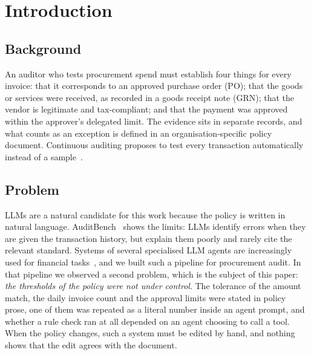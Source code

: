\documentclass[conference]{IEEEtran}
\begin{document}
\section{Introduction}
\subsection{Background}
An auditor who tests procurement spend must establish four things for every invoice: that it corresponds to an approved purchase order (PO); that the goods or services were received, as recorded in a goods receipt note (GRN); that the vendor is legitimate and tax-compliant; and that the payment was approved within the approver's delegated limit. The evidence sits in separate records, and what counts as an exception is defined in an organisation-specific policy document. Continuous auditing proposes to test every transaction automatically instead of a sample~\cite{vasarhelyi1991}.

\subsection{Problem}
LLMs are a natural candidate for this work because the policy is written in natural language. AuditBench~\cite{wang2025auditbench} shows the limits: LLMs identify errors when they are given the transaction history, but explain them poorly and rarely cite the relevant standard. Systems of several specialised LLM agents are increasingly used for financial tasks~\cite{liu2026survey}, and we built such a pipeline for procurement audit. In that pipeline we observed a second problem, which is the subject of this paper: \emph{the thresholds of the policy were not under control}. The tolerance of the amount match, the daily invoice count and the approval limits were stated in policy prose, one of them was repeated as a literal number inside an agent prompt, and whether a rule check ran at all depended on an agent choosing to call a tool. When the policy changes, such a system must be edited by hand, and nothing shows that the edit agrees with the document.
\end{document}
